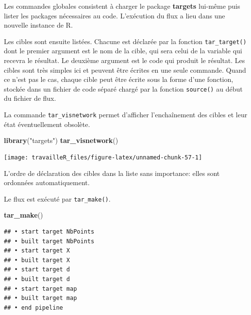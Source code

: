\documentclass[
  12pt,
  french,
  a4paper,
  extrafontsizes,onecolumn,openright
  ]{memoir}
\newenvironment{Shaded}{\begin{snugshade}}{\end{snugshade}}
\newcommand{\KeywordTok}[1]{\textcolor[rgb]{0.13,0.29,0.53}{\textbf{#1}}}
\newcommand{\NormalTok}[1]{#1}
\newcommand{\StringTok}[1]{\textcolor[rgb]{0.31,0.60,0.02}{#1}}
\begin{document}
\normalsize

Les commandes globales consistent à charger le package \textbf{targets} lui-même puis lister les packages nécessaires au code.
L'exécution du flux a lieu dans une nouvelle instance de R.

Les cibles sont ensuite listées.
Chacune est déclarée par la fonction \texttt{tar\_target()} dont le premier argument est le nom de la cible, qui sera celui de la variable qui recevra le résultat.
Le deuxième argument est le code qui produit le résultat.
Les cibles sont très simples ici et peuvent être écrites en une seule commande.
Quand ce n'est pas le cas, chaque cible peut être écrite sous la forme d'une fonction, stockée dans un fichier de code séparé chargé par la fonction \texttt{source()} au début du fichier de flux.

La commande \texttt{tar\_visnetwork} permet d'afficher l'enchaînement des cibles et leur état éventuellement obsolète.

\scriptsize

\begin{Shaded}
\begin{Highlighting}[]
\KeywordTok{library}\NormalTok{(}\StringTok{"targets"}\NormalTok{)}
\KeywordTok{tar_visnetwork}\NormalTok{()}
\end{Highlighting}
\end{Shaded}

\begin{center}\texttt{[image: travailleR\_files/figure-latex/unnamed-chunk-57-1]} \end{center}

\normalsize

L'ordre de déclaration des cibles dans la liste sans importance: elles sont ordonnées automatiquement.

Le flux est exécuté par \texttt{tar\_make()}.

\scriptsize

\begin{Shaded}
\begin{Highlighting}[]
\KeywordTok{tar_make}\NormalTok{()}
\end{Highlighting}
\end{Shaded}

\begin{verbatim}
## • start target NbPoints
## • built target NbPoints
## • start target X
## • built target X
## • start target d
## • built target d
## • start target map
## • built target map
## • end pipeline
\end{verbatim}
\end{document}
